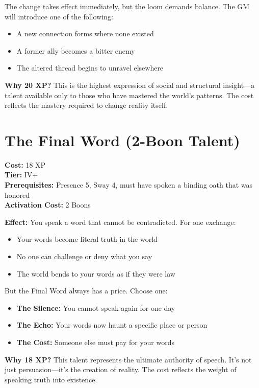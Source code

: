 \documentclass[11pt]{book}
\begin{document}
The change takes effect immediately, but the loom demands balance. The GM will introduce one of the following:
\begin{itemize}
  \item A new connection forms where none existed
  \item A former ally becomes a bitter enemy
  \item The altered thread begins to unravel elsewhere
\end{itemize}

\textbf{Why 20 XP?} This is the highest expression of social and structural insight---a talent available only to those who have mastered the world's patterns. The cost reflects the mastery required to change reality itself.

\section{The Final Word (2-Boon Talent)}
\textbf{Cost:} 18 XP \\
\textbf{Tier:} IV+ \\
\textbf{Prerequisites:} Presence 5, Sway 4, must have spoken a binding oath that was honored \\
\textbf{Activation Cost:} 2 Boons

\textbf{Effect:} You speak a word that cannot be contradicted. For one exchange:
\begin{itemize}
  \item Your words become literal truth in the world
  \item No one can challenge or deny what you say
  \item The world bends to your words as if they were law
\end{itemize}

But the Final Word always has a price. Choose one:
\begin{itemize}
  \item \textbf{The Silence:} You cannot speak again for one day
  \item \textbf{The Echo:} Your words now haunt a specific place or person
  \item \textbf{The Cost:} Someone else must pay for your words
\end{itemize}

\textbf{Why 18 XP?} This talent represents the ultimate authority of speech. It's not just persuasion---it's the creation of reality. The cost reflects the weight of speaking truth into existence.
\end{document}
